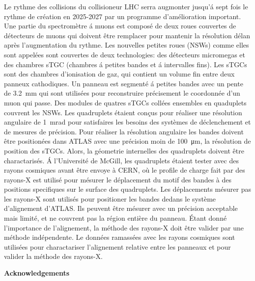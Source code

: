 Le rythme des collisions du collisioneur LHC serra augmonter jusqu'\'{a} sept fois le rythme de cr\'{e}ation en 2025-2027 par un programme d'am\'{e}lioration important. Une partie du spectrom\`{e}tre \'{a} muons est compos\'{e} de deux roues couvertes de d\'{e}tecteurs de muons qui doivent \^{e}tre remplacer pour mantenir la r\'{e}solution d\'{e}lan apr\`{e}s l'augmentation du rythme. Les nouvelles petites roues (NSWs) comme elles sont appel\'{e}es sont couvertes de deux technologies: des d\'{e}tecteurs micromegas et des chambres sTGC (chambres \'{a} petites bandes et \'{a} intervalles fins). Les sTGCs sont des chambres d'ionisation de gaz, qui contient un volume fin entre deux panneux cathodiques. Un panneau est segment\'{e} \'{a} petites bandes avec un pente de \SI{3.2}{mm} qui sont utilis\'{e}es pour reconstruire pr\'{e}cisement le coordonn\'{e}e d'un muon qui passe. Des modules de quatres sTGCs coll\'{e}es ensembles en quaduplets couvrent les NSWs. Les quadruplets \'{e}taient con\c{c}us pour r\'{e}aliser une r\'{e}solution angulaire de \SI{1}{mrad} pour satisfaires les besoins des syst\`{e}mes de d\'{e}clenchement et de mesures de pr\'{e}cision. Pour r\'{e}aliser la r\'{e}solution angulaire les bandes doivent \^{e}tre position\'{e}es dans ATLAS avec une pr\'{e}cision moin de \SI{100}{\micro\meter}, la r\'{e}solution de position des sTGCs. Alors, la g\'{e}ometrie internelles des quadruplets doivent \^{e}tre charactaris\'{e}s. \'{A} l'Universit\'{e} de McGill, les quadruplets \'{e}taient tester avec des rayons cosmiques avant \^{e}tre envoye \`{a} CERN, o\`{u} le profile de charge fait par des rayons-X est utilis\'{e} pour m\'{e}surer le d\'{e}placement du motif des bandes \`{a} des positions specifiques sur le surface des quadruplets. Les d\'{e}placements m\'{e}surer pas les rayons-X sont utilis\'{e}s pour positioner les bandes dedans le syst\`{e}me d'alignement d'ATLAS. Ils peuvent \^{e}tre m\'{e}surer avec un pr\'{e}cision acceptable mais limit\'{e}, et ne couvrent pas la r\'{e}gion enti\`{e}re du panneau. \'{E}tant donn\'{e} l'importance de l'alignement, la m\'{e}thode des rayons-X doit \^{e}tre valider par une m\'{e}thode ind\'{e}pendente. Le donn\'{e}es ramass\'{e}es avec les rayons cosmiques sont utilis\'{e}es pour charactariser l'alignement relative entre les panneaux et pour valider la m\'{e}thode des rayons-X.


\begin{center}\textbf{Acknowledgements}\end{center}

